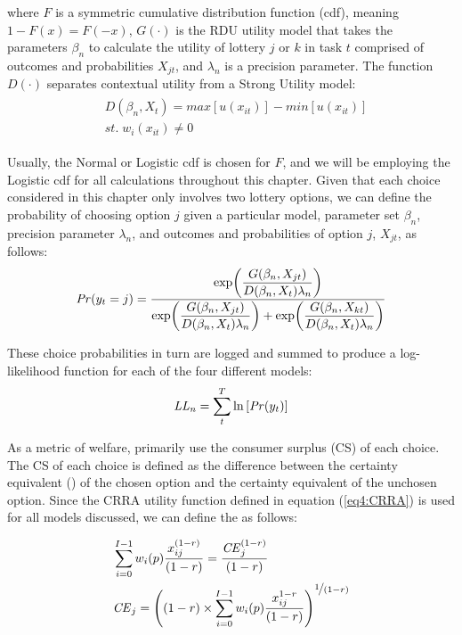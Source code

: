 \documentclass[../main.tex]{subfiles}
\begin{document}
\noindent where $F$ is a symmetric cumulative distribution function (cdf), meaning $1 - F(x)  = F(-x)$, $G(\cdot)$ is the RDU utility model that takes the parameters $\beta_n$ to calculate the utility of lottery $j$ or $k$ in task $t$ comprised of outcomes and probabilities $X_{jt}$, and $\lambda_n$ is a precision parameter.
The function $D(\cdot)$ separates contextual utility from a Strong Utility model:
\begin{align*}
	\label{eq4:W.cu}
	\begin{split}
		&D(\beta_n,X_t) = \mathit{max}[u(x_{it})] - \mathit{min}[u(x_{it})]\\
		&\mathit{st.}\; w_i(x_{it}) \neq 0
	\end{split}
\end{align*}

Usually, the Normal or Logistic cdf is chosen for $F$, and we will be employing the Logistic cdf for all calculations throughout this chapter.
Given that each choice considered in this chapter only involves two lottery options, we can define the probability of choosing option $j$ given a particular model, parameter set $\beta_n$, precision parameter $\lambda_n$, and outcomes and probabilities of option $j$, $X_{jt}$, as follows:
\begin{equation}
	\label{eq4:RE.f}
	{\ensuremath{\mathit{Pr}}}(y_t=j) =\dfrac{\exp\!\left( \dfrac{ G(\beta_n,X_{jt}) }{ D(\beta_n,X_{t})\lambda_n }  \right)}{  \exp\!\left( \dfrac{ G(\beta_n,X_{jt}) }{ D(\beta_n,X_{t})\lambda_n }  \right) + \exp\!\left( \dfrac{ G(\beta_n,X_{kt}) }{ D(\beta_n,X_{t})\lambda_n }  \right)    }
\end{equation}

These choice probabilities in turn are logged and summed to produce a log-likelihood function for each of the four different models:
\begin{equation}
	\label{eq4:ll}
	\mathit{LL_n} = \sum_{t}^T \ln \left[ {\mathit{Pr}}(y_t) \right]
\end{equation}

As a metric of welfare, \textcite{Harrison2016} primarily use the consumer surplus (CS) of each choice.
The CS of each choice is defined as the difference between the certainty equivalent ({\CE}) of the chosen option and the certainty equivalent of the unchosen option.
Since the CRRA utility function defined in equation (\ref{eq4:CRRA}) is used for all models discussed, we can define the {\CE} as follows:

\begin{align}
	\label{eq4:CEcalc}
	\begin{split}
		&\sum_{i=0}^{I-1} w_i(p) \frac{x_{ij}^{(1-r)}}{(1-r)} = \frac{ {\mathit{CE}}_j^{(1-r)}}{(1-r)}\\
		&{\mathit{CE}}_j =  \left( (1-r) \times \sum_{i=0}^{I-1} w_i(p) \frac{x_{ij}^{1-r}}{(1-r)} \right)^{ \displaystyle\nicefrac{1}{(1-r)} }
	\end{split}
\end{align}
\end{document}
